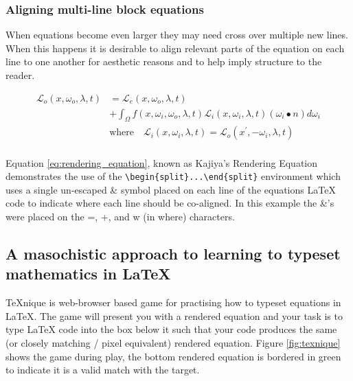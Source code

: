 		\subsubsection{Aligning multi-line block equations}
		
			When equations become even larger they may need cross over multiple new lines. When this happens it is desirable to align relevant parts of the equation on each line to one another for aesthetic reasons and to help imply structure to the reader. 
		
			\begin{equation} \label{eq:rendering_equation}
				\begin{split}
					\mathcal{L}_o\left(x, \omega_o, \lambda, t\right) &= \mathcal{L}_e\left(x, \omega_o, \lambda, t\right)\\
					&+ \int_\Omega f\left(x, \omega_i, \omega_o, \lambda, t\right) \mathcal{L}_i\left(x, \omega_i, \lambda, t\right) \left(\omega_i \bullet n\right) d\omega_i\\
					&\text{where} \quad \mathcal{L}_i\left(x, \omega_i, \lambda, t\right) = \mathcal{L}_o\left(x^\prime, -\omega_i, \lambda, t\right)\\
				\end{split}
			\end{equation}
			
			Equation \ref{eq:rendering_equation}, known as Kajiya's Rendering Equation \cite{kaj86} demonstrates the use of the \lstinline|\begin{split}...\end{split}| environment which uses a single un-escaped \& symbol placed on each line of the equations LaTeX code to indicate where each line should be co-aligned. In this example the \&'s were placed on the =, +, and w (in where) characters.
			
	\subsection{A masochistic approach to learning to typeset mathematics in LaTeX}
	
		
		
		TeXnique \cite{texnique} is web-browser based game for practising how to typeset equations in LaTeX. The game will present you with a rendered equation and your task is to type LaTeX code into the box below it such that your code produces the same (or closely matching / pixel equivalent) rendered equation. Figure \ref{fig:texnique} shows the game during play, the bottom rendered equation is bordered in green to indicate it is a valid match with the target. 

